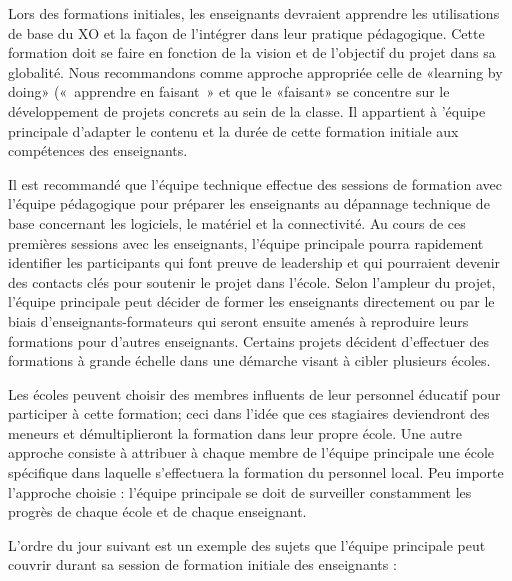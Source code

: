 \documentclass[12pt]{article}
\begin{document}
Lors des  formations initiales, les enseignants devraient apprendre les
utilisations de base du XO et la façon de l'intégrer dans leur pratique
pédagogique. Cette formation doit se faire en fonction de la vision et de
l'objectif du projet dans sa globalité. Nous recommandons comme approche
appropriée celle de «learning by doing» (« apprendre en faisant » et que le
«faisant» se concentre sur le développement de projets concrets au sein de
la classe. Il appartient à 'équipe principale d'adapter le contenu et la
durée de cette formation initiale aux compétences des enseignants. 

Il est recommandé que l'équipe technique effectue des sessions de formation
avec l'équipe pédagogique pour préparer les enseignants au dépannage
technique de base concernant les logiciels, le matériel et la
connectivité. Au cours de ces premières sessions avec les enseignants,
l'équipe principale pourra rapidement identifier les participants qui font
preuve de leadership et qui pourraient devenir des contacts clés pour
soutenir le projet dans l'école. Selon l'ampleur du projet, l'équipe
principale peut décider de former les enseignants directement ou par le
biais d'enseignants-formateurs qui seront ensuite amenés à reproduire leurs
formations pour d'autres enseignants. Certains projets décident d'effectuer
des formations à grande échelle dans une démarche visant à cibler plusieurs
écoles. 

Les écoles peuvent choisir des membres influents de leur personnel éducatif
pour participer à cette formation; ceci dans  l'idée que ces stagiaires
deviendront des meneurs et démultiplieront la formation dans leur propre
école. Une autre approche consiste à attribuer à chaque membre de l'équipe
principale une école spécifique dans laquelle s'effectuera la formation du
personnel local. Peu importe l'approche choisie : l'équipe principale se
doit de surveiller constamment les progrès de chaque école et de chaque
enseignant. 

L'ordre du jour suivant est un exemple des sujets que l'équipe principale
peut couvrir durant sa session de formation initiale des enseignants :
\end{document}
